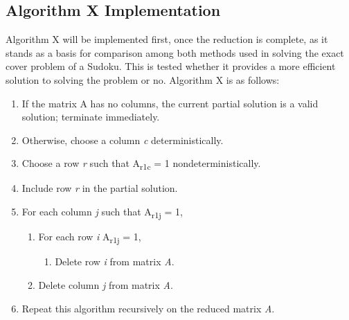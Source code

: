 \documentclass[a4paper,oneside,11pt]{report}
\newcounter{row}
\newcounter{col}
\begin{document}
\subsection{Algorithm X Implementation}
Algorithm X will be implemented first, once the reduction is complete, as it  stands as a basis for comparison among both methods used in solving the exact cover problem of a Sudoku. This is tested whether it provides a more efficient solution to solving the problem or no. Algorithm X is as follows:
\begin{enumerate}
\item If the matrix A has no columns, the current partial solution is a valid solution; terminate immediately.
\vspace{-0.5cm}
\item Otherwise, choose a column \emph{c} deterministically.
\vspace{-0.5cm}
\item Choose a row \emph{r} such that A\textsubscript{r1c}  = 1 nondeterministically.
\vspace{-0.5cm}
\item Include row \emph{r} in the partial solution.
\vspace{-0.5cm}
\item For each column \emph{j} such that A\textsubscript{r1j}  = 1,
\vspace{-0.5cm}
\begin{enumerate}
\item For each row \emph{i} A\textsubscript{r1j}  = 1,
\vspace{-0.5cm}
\begin{enumerate}
\item Delete row \emph{i} from matrix \emph{A}.
\vspace{-0.5cm}
\end{enumerate}
\item Delete column \emph{j} from matrix \emph{A}.
\vspace{-0.5cm}
\end{enumerate}
\item Repeat this algorithm recursively on the reduced matrix \emph{A}.
\end{enumerate}
\end{document}
